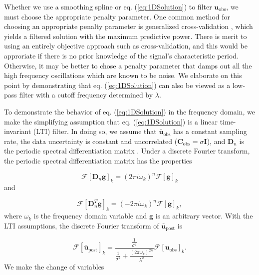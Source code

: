 \documentclass[10pt,a4paper]{article}
\begin{document}
Whether we use a smoothing spline or eq. (\ref{eq:1DSolution}) to filter $\mathbf{u}_\mathrm{obs}$, we must choose the appropriate penalty parameter.  One common method for choosing an appropriate penalty parameter is generalized cross-validation \citep{Craven1979}, which yields a filtered solution with the maximum predictive power.  There is merit to using an entirely objective approach such as cross-validation, and this would be approriate if there is no prior knowledge of the signal's characteristic period.  Otherwise, it may be better to chose a penalty parameter that damps out all the high frequency oscillations which are known to be noise.  We elaborate on this point by demonstrating that eq. (\ref{eq:1DSolution}) can also be viewed as a low-pass filter with a cutoff frequency determined by $\lambda$. 

To demonstrate the behavior of eq. (\ref{eq:1DSolution}) in the frequency domain, we make the simplifying assumption that eq. (\ref{eq:1DSolution}) is a linear time-invariant (LTI) filter.  In doing so, we assume that $\mathbf{\bar{u}}_\mathrm{obs}$ has a constant sampling rate, the data uncertainty is constant and uncorrelated ($\mathbf{C}_\mathrm{obs} = \sigma \mathbf{I}$), and $\mathbf{D}_n$ is the periodic spectral differentiation matrix \citep[e.g.][]{Trefethen2000}.  Under a discrete Fourier transform, the periodic spectral differentiation matrix has the properties 

\begin{equation}\label{eq:Property1}
  \mathcal{F}\left[\mathbf{D}_n \mathbf{g}\right]_k = (2\pi i\omega_k)^n \mathcal{F}\left[\mathbf{g}\right]_k
\end{equation}
and

\begin{equation}\label{eq:Property2}
  \mathcal{F}\left[\mathbf{D}^T_n \mathbf{g}\right]_k = (-2\pi i\omega_k)^n \mathcal{F}\left[\mathbf{g}\right]_k,
\end{equation}
where $\omega_k$ is the frequency domain variable and $\mathbf{g}$ is an arbitrary vector. With the LTI assumptions, the discrete Fourier transform of $\mathbf{\bar{u}}_\mathrm{post}$ is 

\begin{equation}\label{eq:1DFourierSoln1}
\mathcal{F}\left[\mathbf{\bar{u}}_\mathrm{post}\right]_k = \frac{\frac{1}{\sigma^2}}
                               {\frac{1}{\sigma^2} +                  
                                \frac{(2\pi\omega_k)^{2n}}{\lambda^2}}
                                \mathcal{F}\left[\mathbf{u}_\mathrm{obs}\right]_k.
\end{equation}
We make the change of variables 
\end{document}
